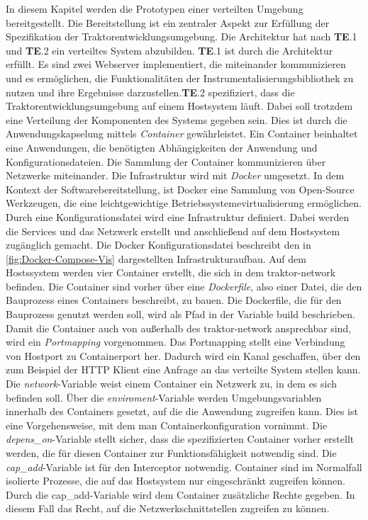 In diesem Kapitel werden die Prototypen einer verteilten Umgebung bereitgestellt. Die Bereitstellung ist ein zentraler Aspekt zur Erfüllung der Spezifikation der Traktorentwicklungsumgebung. Die Architektur hat nach \textbf{TE}.1 und \textbf{TE}.2 ein verteiltes System abzubilden. \textbf{TE}.1 ist durch die Architektur erfüllt. Es sind zwei Webserver implementiert, die miteinander kommunizieren und es ermöglichen, die Funktionalitäten der Instrumentalisierungsbibliothek zu nutzen und ihre Ergebnisse darzustellen.\textbf{TE}.2 spezifiziert, dass die Traktorentwicklungsumgebung auf einem Hostsystem läuft. Dabei soll trotzdem eine Verteilung der Komponenten des Systems gegeben sein. Dies ist durch die Anwendungskapselung mittels \emph{Container} gewährleistet. Ein Container beinhaltet eine Anwendungen, die benötigten Abhängigkeiten der Anwendung und Konfigurationsdateien. Die Sammlung der Container kommunizieren über Netzwerke miteinander. Die Infrastruktur wird mit \emph{Docker} umgesetzt. In dem Kontext der Softwarebereitstellung, ist Docker eine Sammlung von Open-Source Werkzeugen, die eine leichtgewichtige Betriebssystemevirtualisierung ermöglichen. Durch eine Konfigurationsdatei wird eine Infrastruktur definiert. Dabei werden die Services und das Netzwerk erstellt und anschließend auf dem Hostsystem zugänglich gemacht. Die Docker Konfigurationsdatei beschreibt den in \cref{fig:Docker-Compose-Vis} dargestellten Infrastrukturaufbau. Auf dem Hostssystem werden vier Container erstellt, die sich in dem traktor-network befinden. Die Container sind vorher über eine \emph{Dockerfile}, also einer Datei, die den Bauprozess eines Containers beschreibt, zu bauen. Die Dockerfile, die für den Bauprozess genutzt werden soll, wird als Pfad in der Variable build beschrieben. Damit die Container auch von außerhalb des traktor-network ansprechbar sind, wird ein \emph{Portmapping} vorgenommen. Das Portmapping stellt eine Verbindung von Hostport zu Containerport her. Dadurch wird ein Kanal geschaffen, über den zum Beispiel der HTTP Klient eine Anfrage an das verteilte System stellen kann. Die \emph{network}-Variable weist einem Container ein Netzwerk zu, in dem es sich befinden soll. Über die \emph{enviroment}-Variable werden Umgebungsvariablen innerhalb des Containers gesetzt, auf die die Anwendung zugreifen kann. Dies ist eine Vorgehensweise, mit dem man Containerkonfiguration vornimmt. Die \emph{depens\_on}-Variable stellt sicher, dass die spezifizierten Container vorher erstellt werden, die für diesen Container zur Funktionsfähigkeit notwendig sind. Die \emph{cap\_add}-Variable ist für den Interceptor notwendig. Container sind im Normalfall isolierte Prozesse, die auf das Hostsystem nur eingeschränkt zugreifen können. Durch die cap\_add-Variable wird dem Container zusätzliche Rechte gegeben. In diesem Fall das Recht, auf die Netzwerkschnittstellen zugreifen zu können.
